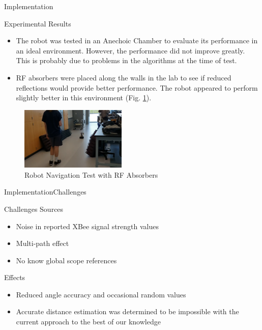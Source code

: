 \documentclass{beamer}
\begin{document}
\begin{frame}{Implementation}
\begin{block}{Experimental Results}
    \begin{itemize}
      \item The robot was tested in an Anechoic Chamber to evaluate its performance in an ideal environment. However, the performance did not improve greatly. This is probably due to problems in the algorithms at the time of test.
      \item RF absorbers were placed along the walls in the lab to see if reduced reflections would provide better performance. The robot appeared to perform slightly better in this environment (Fig. \ref{fig:AbsorberTest}).
    \end{itemize}
  \end{block}
    \begin{figure}
      \centering
      \includegraphics[height=3cm]{figs/img/Absorber_test.png}
      \caption{Robot Navigation Test with RF Absorbers}
      \label{fig:AbsorberTest}
    \end{figure}
\end{frame}


\begin{frame}{Implementation}{Challenges}
  \begin{block}{Challenges}
	Sources
	\begin{itemize}
		\item Noise in reported XBee signal strength values
		\item Multi-path effect
		\item No know global scope references 
	\end{itemize}	  
  	Effects
    \begin{itemize}
    	\item Reduced angle accuracy and occasional random values
    	\item  Accurate distance estimation was determined to be impossible with the current approach to the best of our knowledge
    \end{itemize}
  \end{block}
\end{frame}
\end{document}
